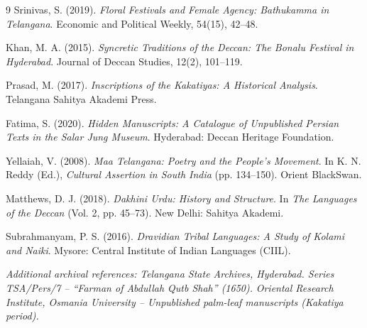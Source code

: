 \documentclass[12pt]{article}
\begin{document}
\begin{thebibliography}{9}
    Srinivas, S. (2019). \textit{Floral Festivals and Female Agency: Bathukamma in Telangana}. Economic and Political Weekly, 54(15), 42–48.

    Khan, M. A. (2015). \textit{Syncretic Traditions of the Deccan: The Bonalu Festival in Hyderabad}. Journal of Deccan Studies, 12(2), 101–119.

    Prasad, M. (2017). \textit{Inscriptions of the Kakatiyas: A Historical Analysis}. Telangana Sahitya Akademi Press.

    Fatima, S. (2020). \textit{Hidden Manuscripts: A Catalogue of Unpublished Persian Texts in the Salar Jung Museum}. Hyderabad: Deccan Heritage Foundation.

    Yellaiah, V. (2008). \textit{Maa Telangana: Poetry and the People’s Movement}. In K. N. Reddy (Ed.), \textit{Cultural Assertion in South India} (pp. 134–150). Orient BlackSwan.

    Matthews, D. J. (2018). \textit{Dakhini Urdu: History and Structure}. In \textit{The Languages of the Deccan} (Vol. 2, pp. 45–73). New Delhi: Sahitya Akademi.

    Subrahmanyam, P. S. (2016). \textit{Dravidian Tribal Languages: A Study of Kolami and Naiki}. Mysore: Central Institute of Indian Languages (CIIL).
    
    \textit{Additional archival references:}
    \textit{Telangana State Archives, Hyderabad. Series TSA/Pers/7 – “Farman of Abdullah Qutb Shah” (1650).}
    \textit{Oriental Research Institute, Osmania University – Unpublished palm-leaf manuscripts (Kakatiya period).}
\end{thebibliography}
\end{document}
